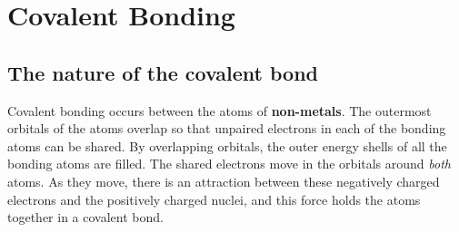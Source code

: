 



\section{Covalent Bonding}
\label{subsec:bonding:covalent}

\subsection{The nature of the covalent bond}

Covalent bonding occurs between the atoms of \textbf{non-metals}. The outermost orbitals of the atoms overlap so that unpaired electrons in each of the bonding atoms can be shared. By overlapping orbitals, the outer energy shells of all the bonding atoms are filled. The shared electrons move in the orbitals around \textit{both} atoms. As they move, there is an attraction between these negatively charged electrons and the positively charged nuclei, and this force holds the atoms together in a covalent bond.


